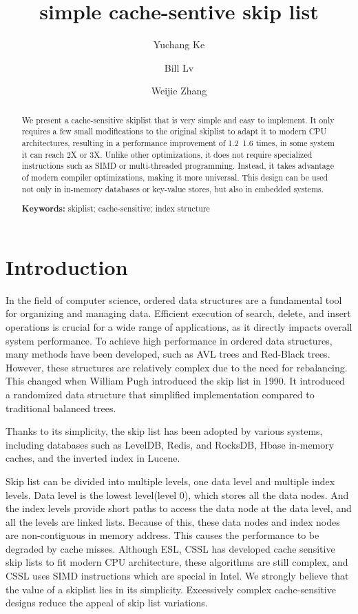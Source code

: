 \documentclass{article}
\title{simple cache-sentive skip list}
\author[1]{Yuchang Ke}
\author[2]{Bill Lv}
\author[3]{Weijie Zhang}
\affil[1]{%
  \institution{} 
  \streetaddress{}
  \city{Wuhan}
  \state{Hubei}
  \postcode{430000}
}
\affil[2]{%
  \institution{} 
  \streetaddress{}
  \city{Wuhan}
  \state{Hubei}
  \postcode{430000}
}
\affil[3]{%
  \institution{Hubei Changjiang Yunxin Media Group Co., Ltd} 
  \streetaddress{No. 788, Gaoxin Ave., Hubei Broadcasting&TV Media Tower}
  \city{Wuhan}
  \state{Hubei}
  \postcode{430000}
}
\newcommand{\keywords}[1]{\par\noindent\textbf{Keywords:} #1}
\begin{document}
\maketitle

\begin{abstract}
      We present a cache-sensitive skiplist that is very simple and easy to implement. It only requires a few small modifications to the original skiplist to adapt it to modern CPU architectures, resulting in a performance improvement of 1.2~1.6 times, in some system it can reach 2X or 3X.
      Unlike other optimizations, it does not require specialized instructions such as SIMD or multi-threaded programming. Instead, it takes advantage of modern compiler optimizations, making it more universal. This design can be used not only in in-memory databases or key-value stores, but also in embedded systems.

\keywords{skiplist; cache-sensitive; index structure}
\end{abstract}



\section{Introduction}

In the field of computer science, ordered data structures are a fundamental tool for organizing and managing data. Efficient execution of search, delete, and insert operations is crucial for a wide range of applications, as it directly impacts overall system performance.
To achieve high performance in ordered data structures, many methods have been developed, such as AVL trees and Red-Black trees. However, these structures are relatively complex due to the need for rebalancing. This changed when William Pugh introduced the skip list in 1990\cite{ref1}. It introduced a randomized data structure that simplified implementation compared to traditional balanced trees.

Thanks to its simplicity, the skip list has been adopted by various systems, including databases such as LevelDB\cite{ref2}, Redis\cite{ref7}, and RocksDB\cite{ref3}, Hbase\cite{ref4} in-memory caches, and the inverted index in Lucene.

Skip list can be divided into multiple levels, one data level and multiple index levels. Data level is the lowest level(level 0), which stores all the data nodes. And the index levels provide short paths to access the data node at the data level, and all the levels are linked lists. Because of this, these data nodes and index nodes are non-contiguous in memory address. This causes the performance to be degraded by cache misses.
Although ESL, CSSL has developed cache sensitive skip lists to fit modern CPU architecture, these algorithms are still complex, and CSSL uses SIMD instructions which are special in Intel. We strongly believe that the value of a skiplist lies in its simplicity.  Excessively complex cache-sensitive designs reduce the appeal of skip list variations.
\end{document}
